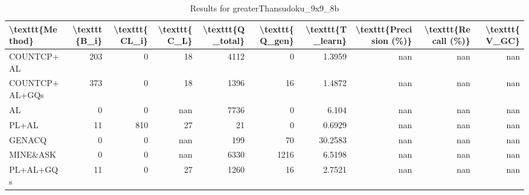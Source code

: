 \begin{table}[ht]
\caption{Results for greaterThansudoku_9x9_8b}
\begin{tabular}{lrrrrrrrrr}
\hline
 \textbackslash{}texttt\{Method\}   &   \textbackslash{}texttt\{B\_i\} &   \textbackslash{}texttt\{CL\_i\} &   \textbackslash{}texttt\{C\_L\} &   \textbackslash{}texttt\{Q\_total\} &   \textbackslash{}texttt\{Q\_gen\} &   \textbackslash{}texttt\{T\_learn\} &   \textbackslash{}texttt\{Precision (\%)\} &   \textbackslash{}texttt\{Recall (\%)\} &   \textbackslash{}texttt\{V\_GC\} \\
\hline
 COUNTCP+AL        &            203 &               0 &             18 &               4112 &                0 &             1.3959 &                      nan &                   nan &             nan \\
 COUNTCP+AL+GQs    &            373 &               0 &             18 &               1396 &               16 &             1.4872 &                      nan &                   nan &             nan \\
 AL                &              0 &               0 &            nan &               7736 &                0 &             6.104  &                      nan &                   nan &             nan \\
 PL+AL             &             11 &             810 &             27 &                 21 &                0 &             0.6929 &                      nan &                   nan &             nan \\
 GENACQ            &              0 &               0 &            nan &                199 &               70 &            30.2583 &                      nan &                   nan &             nan \\
 MINE\&ASK          &              0 &               0 &            nan &               6330 &             1216 &             6.5198 &                      nan &                   nan &             nan \\
 PL+AL+GQs         &             11 &               0 &             27 &               1260 &               16 &             2.7521 &                      nan &                   nan &             nan \\
\hline
\end{tabular}
\end{table}